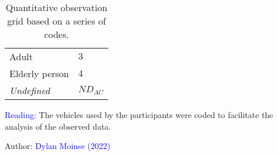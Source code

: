 \begin{table}[h!]
{\begin{tabular}{p{}p{}}
    \small{Adult} & \small{\(3\)}\\
    \small{Elderly person} & \small{\(4\)}\\
        \hdashline
    \small{\textsl{Undefined}} & \small{\(ND_{AC}\)}\\        
        \hline
  \end{tabular}}
    \caption{Quantitative observation grid based on a series of codes.}
    \label{table-chap3:code-observation-quantitative}
    \vspace{5pt}
    \begin{flushleft}\scriptsize{
    \textcolor{blue}{Reading:} The vehicles used by the participants were coded to facilitate the analysis of the observed data.
    }\end{flushleft}
    \begin{flushright}\scriptsize{
    Author: \textcolor{blue}{Dylan Moinse (2022)}
    }\end{flushright}
  \end{table}